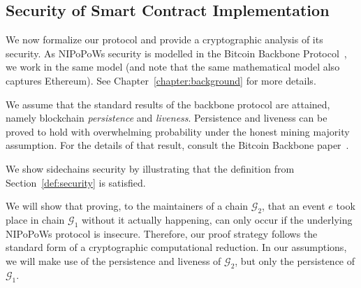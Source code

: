 \subsection{Security of Smart Contract Implementation}


We now formalize our protocol and provide a cryptographic analysis of its
security. As NIPoPoWs security is modelled in the Bitcoin
Backbone Protocol~\cite{backbone}, we work in the same model (and note
that the same mathematical model also captures Ethereum). See Chapter~\ref{chapter:background} for more details.

We assume that the
standard results of the backbone protocol are attained, namely blockchain
\emph{persistence} and \emph{liveness}. Persistence and liveness can be proved
to hold with overwhelming probability under the honest mining majority
assumption. For the details of that result, consult the Bitcoin Backbone
paper~\cite{backbone}.

We show sidechains security by illustrating that the definition from Section~\ref{def:security} is satisfied.

We will show that proving, to the maintainers of a chain $\mathcal{G}_2$, that
an event $e$ took place in chain $\mathcal{G}_1$ without it actually happening,
can only occur if the underlying NIPoPoWs protocol is insecure. Therefore, our
proof strategy follows the standard form of a cryptographic computational
reduction. In our assumptions, we will make use of the persistence and
liveness of $\mathcal{G}_2$, but only the persistence of $\mathcal{G}_1$.

